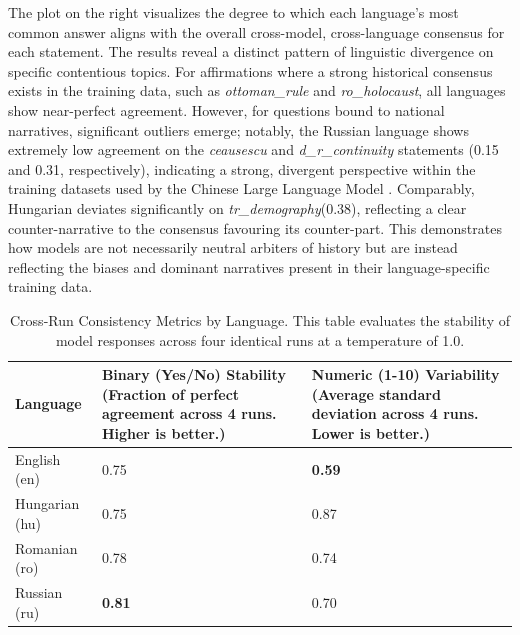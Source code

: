 \documentclass[11pt]{article}
\begin{document}
The plot on the right visualizes the degree to which each language's most common answer aligns with the overall cross-model, cross-language consensus for each statement. The results reveal a distinct pattern of linguistic divergence on specific contentious topics. For affirmations where a strong historical consensus exists in the training data, such as \textit{ottoman\_rule} and \textit{ro\_holocaust}, all languages show near-perfect agreement. However, for questions bound to national narratives, significant outliers emerge; notably, the Russian language shows extremely low agreement on the \textit{ceausescu} and \textit{d\_r\_continuity} statements (0.15 and 0.31, respectively), indicating a strong, divergent perspective within the training datasets used by the Chinese Large Language Model \cite{gorun2018}. Comparably, Hungarian deviates significantly on \textit{tr\_demography}(0.38), reflecting a clear counter-narrative to the consensus favouring its counter-part. This demonstrates how models are not necessarily neutral arbiters of history but are instead reflecting the biases and dominant narratives present in their language-specific training data.
\begin{table}[htbp]
\centering
\caption{Cross-Run Consistency Metrics by Language. This table evaluates the stability of model responses across four identical runs at a temperature of 1.0.}
\label{tab:language_consistency}
\renewcommand{\arraystretch}{1.2}
\begin{tabular}{l C{5.5cm} C{5.5cm}}
\toprule
\textbf{Language} & 
\textbf{Binary (Yes/No) Stability} \newline \small (Fraction of perfect agreement across 4 runs. Higher is better.) & 
\textbf{Numeric (1-10) Variability} \newline \small (Average standard deviation across 4 runs. Lower is better.) \\
\midrule
English (en)    & 0.75 & \textbf{0.59} \\
Hungarian (hu)  & 0.75 & 0.87 \\
Romanian (ro)   & 0.78 & 0.74 \\
Russian (ru)    & \textbf{0.81} & 0.70 \\
\bottomrule
\end{tabular}
\end{table}
\end{document}
